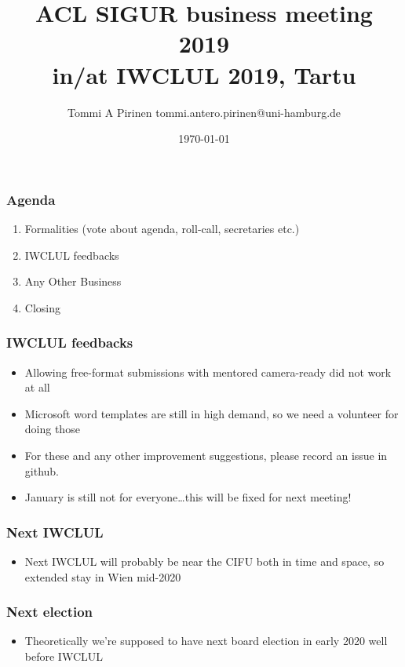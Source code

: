 \documentclass{beamer}
\title{ACL SIGUR business meeting 2019\\
\scriptsize{in/at IWCLUL 2019, Tartu}}
\author{Tommi A Pirinen\scriptsize
\guilsinglleft{}tommi.antero.pirinen@uni-hamburg.de\guilsinglright{}}
\institute{Universität Hamburg\\
Hamburger Zentrum für Sprachkorpora}
\date{\today}
\begin{document}

\maketitle

\begin{frame}
    \frametitle{Agenda}
    \begin{enumerate}
        \item Formalities (vote about agenda, roll-call, secretaries etc.)
        \item IWCLUL feedbacks
        \item Any Other Business
        \item Closing
    \end{enumerate}
\end{frame}


\begin{frame}
    \frametitle{IWCLUL feedbacks}
    \begin{itemize}
        \item Allowing free-format submissions with mentored camera-ready did
            not work at all
        \item Microsoft word templates are still in high demand, so we need a
            volunteer for doing those
        \item For these and any other improvement suggestions, please record an
            issue in github.
        \item January is still not for everyone\ldots this will be fixed for next
            meeting!
    \end{itemize}
\end{frame}

\begin{frame}
    \frametitle{Next IWCLUL}
    \begin{itemize}
        \item Next IWCLUL will probably be near the CIFU both in time and space,
            so extended stay in Wien mid-2020
    \end{itemize}
\end{frame}

\begin{frame}
    \frametitle{Next election}
    \begin{itemize}
        \item Theoretically we're supposed to have next board election in early
            2020 well before IWCLUL
    \end{itemize}
\end{frame}
\end{document}
